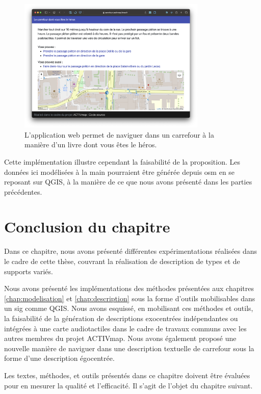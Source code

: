 \begin{figure}[ht]
    \centering
    \includegraphics[width=0.8\textwidth]{images/experimentation/carrefour_heros.png}
    \caption[Démonstrateur de navigation virtuelle dans un carrefour]{L'application web permet de naviguer dans un carrefour à la manière d'un livre dont vous êtes le héros.}
    \label{fig:experimentation_egocentre_screen}
\end{figure}

\newpar{}

Cette implémentation illustre cependant la faisabilité de la proposition. Les données ici modélisées à la main pourraient être générée depuis \gls{osm} en se reposant sur QGIS, à la manière de ce que nous avons présenté dans les parties précédentes.

\section{Conclusion du chapitre}

Dans ce chapitre, nous avons présenté différentes expérimentations réalisées dans le cadre de cette thèse, couvrant la réalisation de description de types et de supports variés.

\newpar{}

Nous avons présenté les implémentations des méthodes présentées aux chapitres \ref{chap:modelisation} et \ref{chap:description} sous la forme d'outils mobilisables dans un \gls{sig} comme QGIS. Nous avons esquissé, en mobilisant ces méthodes et outils, la faisabilité de la génération de descriptions exocentrées indépendantes ou intégrées à une carte audiotactiles dans le cadre de travaux communs avec les autres membres du projet ACTIVmap. Nous avons également proposé une nouvelle manière de naviguer dans une description textuelle de carrefour sous la forme d'une description égocentrée.

\newpar{}

Les textes, méthodes, et outils présentés dans ce chapitre doivent être évaluées pour en mesurer la qualité et l'efficacité. Il s'agit de l'objet du chapitre suivant.